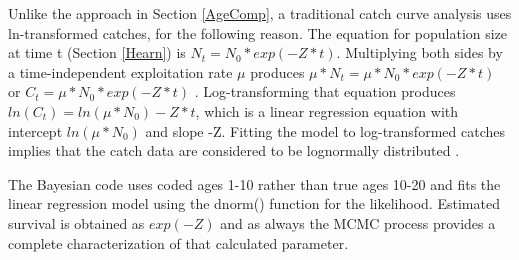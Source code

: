 \documentclass[
]{krantz}
\begin{document}
Unlike the approach in Section \ref{AgeComp}, a traditional catch curve analysis uses ln-transformed catches, for the following reason. The equation for population size at time t (Section \ref{Hearn}) is \(N_t = N_0 * exp(-Z*t)\). Multiplying both sides by a time-independent exploitation rate \(\mu\) produces \(\mu*N_t = \mu*N_0 * exp(-Z*t)\) or \(C_t = \mu*N_0 * exp(-Z*t)\) \citep{quinn.deriso_1999}. Log-transforming that equation produces \(ln(C_t) = ln(\mu * N_0) -Z*t\), which is a linear regression equation with intercept \(ln(\mu*N_0)\) and slope -Z. Fitting the model to log-transformed catches implies that the catch data are considered to be lognormally distributed \citep{quinn.deriso_1999}.

The Bayesian code uses coded ages 1-10 rather than true ages 10-20 and fits the linear regression model using the dnorm() function for the likelihood. Estimated survival is obtained as \(exp(-Z)\) and as always the MCMC process provides a complete characterization of that calculated parameter.
\end{document}
